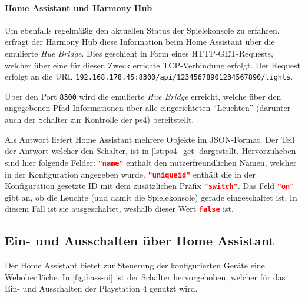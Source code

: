 



\newpage
\paragraph{Home Assistant und Harmony Hub}
Um ebenfalls regelmäßig den aktuellen Status der Spielekonsole zu erfahren,
erfragt der Harmony Hub diese Information beim Home Assistant über die emulierte \textit{Hue Bridge}.
Dies geschieht in Form eines HTTP-GET-Requests,
welcher über eine für diesen Zweck errichte TCP-Verbindung erfolgt.
Der Request erfolgt an die URL \nolinkurl{192.168.178.45:8300/api/12345678901234567890/lights}.

Über den Port \texttt{8300} wird die emulierte \textit{Hue Bridge} erreicht,
welche über den angegebenen Pfad Informationen über alle eingerichteten \enquote{Leuchten}
(darunter auch der Schalter zur Kontrolle der \ac{ps4}) bereitstellt.

Als Antwort liefert Home Assistant mehrere Objekte im JSON-Format.
Der Teil der Antwort welcher den Schalter,
ist in \autoref{lst:ps4_get} dargestellt.
Hervorzuheben sind hier folgende Felder:
\lstinline[language=json]{"name"} enthält den nutzerfreundlichen Namen,
welcher in der Konfiguration angegeben wurde.
\lstinline[language=json]{"uniqueid"} enthält die
in der Konfiguration gesetzte ID mit dem zusätzlichen Präfix \lstinline[language=json]{"switch"}.
Das Feld \lstinline[language=json]{"on"} gibt an, ob die Leuchte (und damit die Spielekonsole) gerade eingeschaltet ist.
In diesem Fall ist sie ausgeschaltet, weshalb dieser Wert \lstinline[language=json]{false} ist.



\newpage

\subsection{Ein- und Ausschalten über Home Assistant}\label{sec:durchfuehrung-hassbian}
Der Home Assistant bietet zur Steuerung der konfigurierten Geräte eine Weboberfläche.
In \autoref{fig:hass-ui} ist der Schalter hervorgehoben, welcher für das Ein- und Ausschalten der Playstation 4 genutzt wird.

